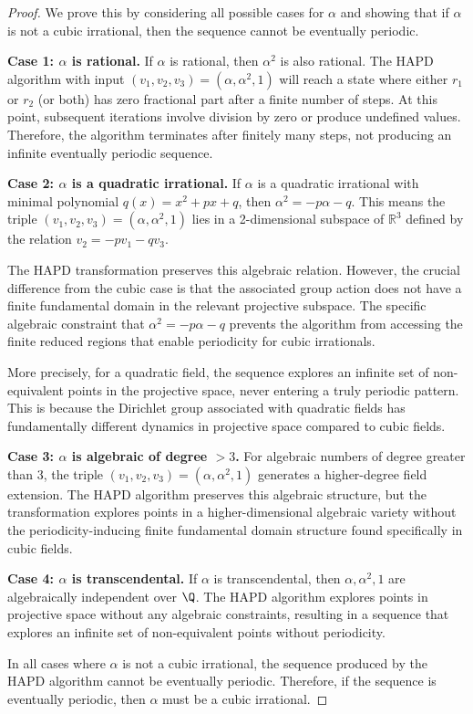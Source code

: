 \begin{proof}
We prove this by considering all possible cases for $\alpha$ and showing that if $\alpha$ is not a cubic irrational, then the sequence cannot be eventually periodic.

\textbf{Case 1: $\alpha$ is rational.} If $\alpha$ is rational, then $\alpha^2$ is also rational. The HAPD algorithm with input $(v_1, v_2, v_3) = (\alpha, \alpha^2, 1)$ will reach a state where either $r_1$ or $r_2$ (or both) has zero fractional part after a finite number of steps. At this point, subsequent iterations involve division by zero or produce undefined values. Therefore, the algorithm terminates after finitely many steps, not producing an infinite eventually periodic sequence.

\textbf{Case 2: $\alpha$ is a quadratic irrational.} If $\alpha$ is a quadratic irrational with minimal polynomial $q(x) = x^2 + px + q$, then $\alpha^2 = -p\alpha - q$. This means the triple $(v_1, v_2, v_3) = (\alpha, \alpha^2, 1)$ lies in a 2-dimensional subspace of $\mathbb{R}^3$ defined by the relation $v_2 = -pv_1 - qv_3$.

The HAPD transformation preserves this algebraic relation. However, the crucial difference from the cubic case is that the associated group action does not have a finite fundamental domain in the relevant projective subspace. The specific algebraic constraint that $\alpha^2 = -p\alpha - q$ prevents the algorithm from accessing the finite reduced regions that enable periodicity for cubic irrationals.

More precisely, for a quadratic field, the sequence explores an infinite set of non-equivalent points in the projective space, never entering a truly periodic pattern. This is because the Dirichlet group associated with quadratic fields has fundamentally different dynamics in projective space compared to cubic fields.

\textbf{Case 3: $\alpha$ is algebraic of degree $> 3$.} For algebraic numbers of degree greater than 3, the triple $(v_1, v_2, v_3) = (\alpha, \alpha^2, 1)$ generates a higher-degree field extension. The HAPD algorithm preserves this algebraic structure, but the transformation explores points in a higher-dimensional algebraic variety without the periodicity-inducing finite fundamental domain structure found specifically in cubic fields.

\textbf{Case 4: $\alpha$ is transcendental.} If $\alpha$ is transcendental, then $\alpha, \alpha^2, 1$ are algebraically independent over $\Q$. The HAPD algorithm explores points in projective space without any algebraic constraints, resulting in a sequence that explores an infinite set of non-equivalent points without periodicity.

In all cases where $\alpha$ is not a cubic irrational, the sequence produced by the HAPD algorithm cannot be eventually periodic. Therefore, if the sequence is eventually periodic, then $\alpha$ must be a cubic irrational.
\end{proof}

